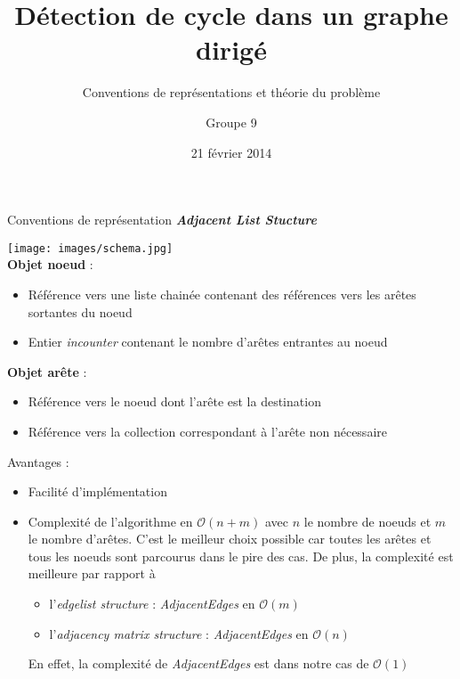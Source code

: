 \documentclass[10pt]{beamer}
\title[Détection de cycle dans un graphe dirigé]{Détection de cycle dans un graphe dirigé}
\subtitle{Conventions de représentations et théorie du problème}
\author{Groupe 9}
\institute{EPL - LINGI1122}
\date{21 février 2014}
\begin{document}
\begin{frame}[allowframebreaks]{Conventions de représentation}
\textbf{\textit{Adjacent List Stucture}}\\
\begin{multicols}{2}
\texttt{[image: images/schema.jpg]}\\
\textbf{Objet noeud} : \begin{itemize}
\item Référence vers une liste chainée contenant des références vers les arêtes sortantes du noeud
\item Entier \textit{incounter} contenant le nombre d'arêtes entrantes au noeud\\
\end{itemize}

\textbf{Objet arête} : \begin{itemize}
\item Référence vers le noeud dont l'arête est la destination
\item Référence vers la collection correspondant à l'arête non nécessaire
\end{itemize}
\end{multicols}

\newpage
Avantages : \\
\begin{itemize}
\item Facilité d'implémentation
\item Complexité de l'algorithme en $\mathcal{O}(n+m)$ avec $n$ le nombre de noeuds et $m$ le nombre d'arêtes. C'est le meilleur choix possible car toutes les arêtes et tous les noeuds sont parcourus dans le pire des cas. De plus, la complexité est meilleure par rapport à
\begin{itemize}
\item l'\textit{edgelist structure} : \textit{AdjacentEdges} en $\mathcal{O}(m)$
\item l'\textit{adjacency matrix structure} : \textit{AdjacentEdges} en $\mathcal{O}(n)$
\end{itemize}
En effet, la complexité de \textit{AdjacentEdges} est dans notre cas de $\mathcal{O}(1)$
\end{itemize}
\end{frame}
\end{document}
